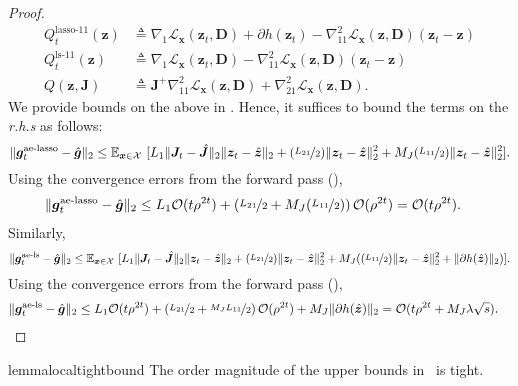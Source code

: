 \documentclass[10pt]{article} %
\newcommand{\E}{\mathbb{E}} %
\newcommand{\D}{{\bm D}}
\newcommand{\J}{{\bm J}}
\newcommand{\x}{{\bm x}}
\newcommand{\z}{{\bm z}}
\newcommand{\g}{{\bm g}}
\newcommand{\Loss}{\mathcal{L}}
\newcommand{\X}{\mathcal{X}}
\begin{document}
\begin{proof}
\begin{equation}
\begin{aligned}
Q_t^{\text{lasso-}11}(\z) &\triangleq \nabla_1 \Loss_{\x}(\z_t, \D) + \partial h(\z_t) - \nabla_{11}^2\Loss_{\x}(\z, \D) (\z_t - \z)\\
Q_t^{\text{ls-}11}(\z) &\triangleq \nabla_1 \Loss_{\x}(\z_t, \D) - \nabla_{11}^2\Loss_{\x}(\z, \D) (\z_t - \z)\\
Q(\z, \J) &\triangleq \J^+ \nabla_{11}^2\Loss_{\x}(\z, \D) + \nabla_{21}^2\Loss_{\x}(\z, \D).
\end{aligned}
\end{equation}
We provide bounds on the above in . Hence, it suffices to bound the terms on the {\it r.h.s} as follows:
\begin{equation}
\| \g_t^{\text{ae-lasso}} - \hat \g  \|_2 \leq \E_{\x \in \X}\ [ L_1 \| \J_t - \hat \J \|_2 \| \z_t - \hat \z \|_2 + (\nicefrac{L_{21}}{2}) \| \z_t - \hat \z \|_2^2 + M_J (\nicefrac{L_{11}}{2}) \| \z_t - \hat \z \|_2^2 ].
\end{equation}
Using the convergence errors from the forward pass (),
 \begin{equation}
\begin{aligned}
\| \g_t^{\text{ae-lasso}} - \hat \g  \|_2 &\leq L_1 \mathcal{O}(t \rho^{2t}) + \left(\nicefrac{L_{21}}{2} + M_J (\nicefrac{L_{11}}{2})\right) \mathcal{O}(\rho^{2t}) = \mathcal{O}(t \rho^{2t}).
\end{aligned}
\end{equation}
Similarly,
\begin{equation}
\| \g_t^{\text{ae-ls}} - \hat \g  \|_2 \leq \E_{\x \in \X}\ [ L_1 \| \J_t - \hat \J \|_2 \| \z_t - \hat \z \|_2 + (\nicefrac{L_{21}}{2}) \| \z_t - \hat \z \|_2^2 + M_J ((\nicefrac{L_{11}}{2}) \| \z_t - \hat \z \|_2^2 + \| \partial h(\hat \z) \|_2)].
\end{equation}
Using the convergence errors from the forward pass (),
 \begin{equation}
\begin{aligned}
\| \g_t^{\text{ae-ls}} - \hat \g  \|_2 &\leq L_1 \mathcal{O}(t \rho^{2t}) + \left(\nicefrac{L_{21}}{2} + \nicefrac{M_J L_{11}}{2}\right) \mathcal{O}(\rho^{2t}) + M_J \| \partial h(\hat \z) \|_2 = \mathcal{O}(t \rho^{2t} + M_J \lambda \sqrt{s}).
\end{aligned}
\end{equation}
\end{proof}
%
\begin{restatable}{lemma}{localtightbound}\label{lemma:localtightbound}
The order magnitude of the upper bounds in~ is tight.
\end{restatable}
\end{document}
